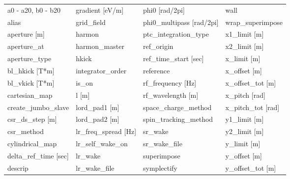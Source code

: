  \begin{tabular}{llll} \toprule
a0 - a20, b0 - b20               & gradient [eV/m]                  & phi0 [rad/2pi]                   & wall                             \\
alias                            & grid_field                       & phi0_multipass [rad/2pi]         & wrap_superimpose                 \\
aperture [m]                     & harmon                           & ptc_integration_type             & x1_limit [m]                     \\
aperture_at                      & harmon_master                    & ref_origin                       & x2_limit [m]                     \\
aperture_type                    & hkick                            & ref_time_start [sec]             & x_limit [m]                      \\
bl_hkick [T*m]                   & integrator_order                 & reference                        & x_offset [m]                     \\
bl_vkick [T*m]                   & is_on                            & rf_frequency [Hz]                & x_offset_tot [m]                 \\
cartesian_map                    & l [m]                            & rf_wavelength [m]                & x_pitch [rad]                    \\
create_jumbo_slave               & lord_pad1 [m]                    & space_charge_method              & x_pitch_tot [rad]                \\
csr_ds_step [m]                  & lord_pad2 [m]                    & spin_tracking_method             & y1_limit [m]                     \\
csr_method                       & lr_freq_spread [Hz]              & sr_wake                          & y2_limit [m]                     \\
cylindrical_map                  & lr_self_wake_on                  & sr_wake_file                     & y_limit [m]                      \\
delta_ref_time [sec]             & lr_wake                          & superimpose                      & y_offset [m]                     \\
descrip                          & lr_wake_file                     & symplectify                      & y_offset_tot [m]                 \\

\end{tabular}

